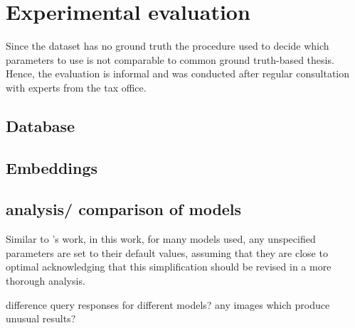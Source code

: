 \chapter{Experimental evaluation}\label{ch:evaluation}

Since the dataset has no ground truth the procedure used to decide which parameters to use is not comparable to common ground truth-based thesis.
Hence, the evaluation is informal and was conducted after regular consultation with experts from the tax office.

 \section{Database}\label{sec:eval-db}
 

 

 
 
\section{Embeddings}\label{sec:eval-embeddings}
















\section{analysis/ comparison of models}\label{sec:evaluation-models}

Similar to \citeauthor{glove2014}'s work, in this work, for many models used, any unspecified parameters are set to their default values, 
assuming that they are close to optimal
acknowledging that this simplification should be revised in a more thorough analysis.

difference query responses for different models?
any images which produce unusual results?

